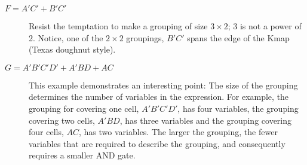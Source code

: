 \begin{changemargin}{1.5cm}{1.5cm}

\begin{description}
\item [$F=A'C'+B'C'$]
    Resist the temptation to make a grouping of size $3 \times 2$;
    3 is not a power of 2.  Notice, one of the $2 \times 2$
    groupings, $B'C'$ spans the edge of the Kmap (Texas doughnut style).

\item [$G=A'B'C'D'+A'BD+AC$]
    This example demonstrates an interesting point: The size of the
    grouping determines the number of variables in the \SOPmin expression.
    For example, the grouping for covering one cell, $A'B'C'D'$, has four
    variables, the grouping covering two cells, $A'BD$, has three variables
    and the grouping covering four cells, $AC$, has two variables.  The
    larger the grouping, the fewer variables that are required to describe
    the grouping, and consequently requires a smaller AND gate.


\end{description}
\end{changemargin}
